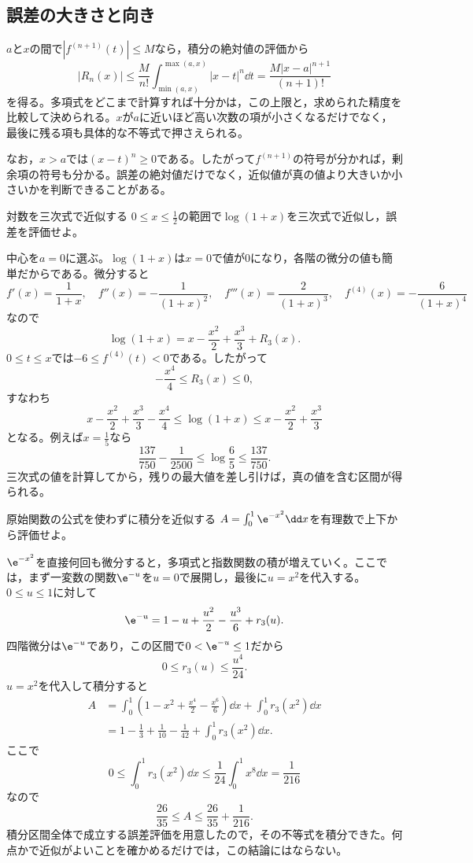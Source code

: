 \subsection{誤差の大きさと向き}

$a$と$x$の間で$|f^{(n+1)}(t)|\leq M$なら，積分の絶対値の評価から
\[
 |R_n(x)|\leq\frac{M}{n!}\int_{\min(a,x)}^{\max(a,x)}|x-t|^n\dd t
 =\frac{M|x-a|^{n+1}}{(n+1)!}
\]
を得る。多項式をどこまで計算すれば十分かは，この上限と，求められた精度を比較して決められる。$x$が$a$に近いほど高い次数の項が小さくなるだけでなく，最後に残る項も具体的な不等式で押さえられる。

なお，$x>a$では$(x-t)^n\geq0$である。したがって$f^{(n+1)}$の符号が分かれば，剰余項の符号も分かる。誤差の絶対値だけでなく，近似値が真の値より大きいか小さいかを判断できることがある。

\begin{example}{対数を三次式で近似する}
$0\leq x\leq\frac12$の範囲で$\log(1+x)$を三次式で近似し，誤差を評価せよ。
\end{example}

中心を$a=0$に選ぶ。$\log(1+x)$は$x=0$で値が$0$になり，各階の微分の値も簡単だからである。微分すると
\[
 f'(x)=\frac{1}{1+x},\quad
 f''(x)=-\frac{1}{(1+x)^2},\quad
 f'''(x)=\frac{2}{(1+x)^3},\quad
 f^{(4)}(x)=-\frac{6}{(1+x)^4}
\]
なので
\[
 \log(1+x)=x-\frac{x^2}{2}+\frac{x^3}{3}+R_3(x).
\]
$0\leq t\leq x$では$-6\leq f^{(4)}(t)<0$である。したがって
\[
 -\frac{x^4}{4}\leq R_3(x)\leq0,
\]
すなわち
\[
 x-\frac{x^2}{2}+\frac{x^3}{3}-\frac{x^4}{4}
 \leq\log(1+x)
 \leq x-\frac{x^2}{2}+\frac{x^3}{3}
\]
となる。例えば$x=\frac15$なら
\[
 \frac{137}{750}-\frac{1}{2500}
 \leq\log\frac65\leq\frac{137}{750}.
\]
三次式の値を計算してから，残りの最大値を差し引けば，真の値を含む区間が得られる。

\begin{example}{原始関数の公式を使わずに積分を近似する}
$A=\int_0^1\e^{-x^2}\dd x$を有理数で上下から評価せよ。
\end{example}

$\e^{-x^2}$を直接何回も微分すると，多項式と指数関数の積が増えていく。ここでは，まず一変数の関数$\e^{-u}$を$u=0$で展開し，最後に$u=x^2$を代入する。$0\leq u\leq1$に対して
\[
 \e^{-u}=1-u+\frac{u^2}{2}-\frac{u^3}{6}+r_3(u).
\]
四階微分は$\e^{-u}$であり，この区間で$0<\e^{-u}\leq1$だから
\[
 0\leq r_3(u)\leq\frac{u^4}{24}.
\]
$u=x^2$を代入して積分すると
\[
\begin{aligned}
 A&=\int_0^1\left(1-x^2+\frac{x^4}{2}-\frac{x^6}{6}\right)\dd x
       +\int_0^1r_3(x^2)\dd x\\
  &=1-\frac13+\frac1{10}-\frac1{42}
       +\int_0^1r_3(x^2)\dd x.
\end{aligned}
\]
ここで
\[
 0\leq\int_0^1r_3(x^2)\dd x
 \leq\frac1{24}\int_0^1x^8\dd x=\frac1{216}
\]
なので
\[
 \boxed{\frac{26}{35}\leq A\leq\frac{26}{35}+\frac1{216}}.
\]
積分区間全体で成立する誤差評価を用意したので，その不等式を積分できた。何点かで近似がよいことを確かめるだけでは，この結論にはならない。

